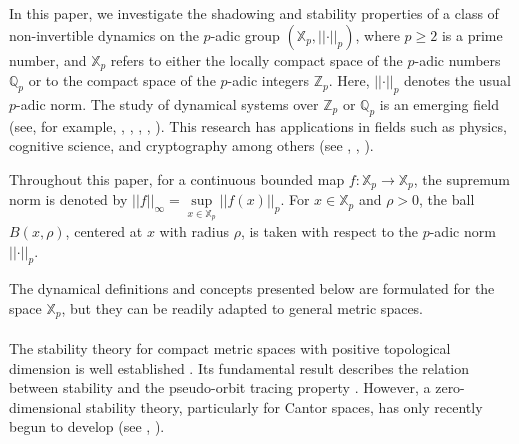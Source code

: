 \documentclass[a4paper, 12pt]{article}
\theoremstyle{definition}
\begin{document}
	
	In this paper, we investigate the shadowing and stability properties of a class of non-invertible dynamics on the $p$-adic group $ \left(  \mathbb{X}_{p},  \left| \left|  \cdot  \right|  \right|_{p}  \right) $, where $p\ge 2$ is a prime number, and $\mathbb{X}_{p}$ refers to either the locally compact space of the $p$-adic numbers $\mathbb{Q}_{p}$ or to the compact space of the $p$-adic integers $\mathbb{Z}_{p}$. Here, $ \left| \left|  \cdot  \right|  \right|_{p}$ denotes the usual $p$-adic norm. 
	The study of dynamical systems over $\mathbb{Z}_{p}$ or $\mathbb{Q}_p$ is an emerging field (see, for example,  \cite{Bastos-Caprio-Messaudi_Shadowing_and_Stability_in_p-adic_Dynamics},  \cite{Bryk_Silva-Measurable_Dynamics_of_simple_p-adic_Polynomials}, \cite{Darji_Concalves_Sobottka-Shadowing_Finite_Order_Shifts_and_Ultrametric_Spaces},  \cite{Durand_Paccaut-Minimal_Polynomial_Dynamics_on_the_set_of_3-adic_Integers}, \cite{Fan_Li_Yao-Strict_Ergodicity_of_Affine_p-adic_dynamical_systems_on_Zp}). This research has applications in fields such as physics, cognitive science, and cryptography among others (see \cite{Anashin-The_non-Archimedean_theory_of_discrete_systems}, \cite{Khrennikov_Nilsson-p-adic_Deterministic_and_Random_Dynamics},  \cite{Krhenikov_Oleschko_Lopez-Applications_of_p-adic_numbers_from_physics_to_geology}).
	
	Throughout this paper, for a continuous bounded map $f: \mathbb{X}_{p} \to \mathbb{X}_{p}$, the supremum norm is denoted by $ \left| \left|  f  \right|  \right|_{ \infty } = \underset{x \in \mathbb{X}_{p}}{\sup}  \left| \left|  f \left(  x  \right)   \right|  \right|_{p}$. 
	For $ x \in \mathbb{X}_{p}$ and $ \rho > 0$, the ball $B \left(  x, \rho  \right) $, centered at $x$ with radius $\rho$, is taken with respect to the $p$-adic norm $ \left| \left|  \cdot  \right|  \right|_{p}$.
	
	The dynamical definitions and concepts presented below are formulated for the space $\mathbb{X}_{p}$, but they can be readily adapted to general metric spaces. 
	
	
	\paragraph{}
	The stability theory for compact metric spaces with positive topological dimension is well established \cite{Aoki-Topological_Dynamics, Pilyugin-Shadowing_in_Dynamical_Systems}.  Its fundamental result describes the relation between stability and the pseudo-orbit tracing property \cite{Walters_On_the_Pseudo_Orbit_Tracing_Property_and_its_relationship_to_Stability}. However, a zero-dimensional stability theory, particularly for Cantor spaces, has only recently begun to develop (see \cite{Bastos-Caprio-Messaudi_Shadowing_and_Stability_in_p-adic_Dynamics}, \cite{Kawaguchi_Topological_Stability_and_Shadowing_of_Zero-dimensional_Dynamical_Systems}). 
	
\end{document}
